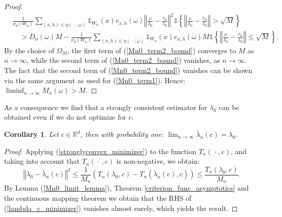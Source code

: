 \documentclass{article}
\newcommand{\RR}{\mathbb{R}}
\newcommand{\blank}{{\mspace{2mu}\cdot\mspace{2mu}}}
\theoremstyle{plain}
\newtheorem{corollary}{Corollary}
\theoremstyle{remark}
\theoremstyle{definition}
\begin{document}
\begin{proof}
    \begin{align}
        &\frac{1}{\nu_d(W_n)}\sum_{(x,h) \in \eta(\blank;\omega)} \mathds{1}_{W_n}(x)v_{x,h}(\omega)\left\Vert \frac{x}{\lambda_0} - \frac{c_0}{\lambda_0} \right\Vert^2 \mathds{1}\left\{\left\Vert \frac{x}{\lambda_0} - \frac{c_0}{\lambda_0} \right\Vert > \sqrt{M} \right\} \nonumber \\
        &\quad> D_n(\omega)M - \frac{1}{\nu_d(W_n)}\sum_{(x,h) \in \eta(\blank;\omega)} \mathds{1}_{W_n}(x)v_{x,h}(\omega)M\mathds{1}\left\{\left\Vert \frac{x}{\lambda_0} - \frac{c_0}{\lambda_0} \right\Vert \leq \sqrt{M} \right\} .\label{Mn0_term2_bound}
    \end{align}
    By the choice of $\Omega_M$, the first term of (\ref{Mn0_term2_bound}) converges to $M$ as $n \to \infty$, while the second term of (\ref{Mn0_term2_bound}) vanishes, as $n \to \infty$. The fact that the second term of (\ref{Mn0_term2_bound}) vanishes can be shown via the same argument as used for (\ref{Mn0_term1}). Hence: $\liminf_{n \to \infty} M_n(\omega) > M$. 
\end{proof}

As a consequence we find that a strongly consistent estimator for $\lambda_0$ can be obtained even if we do not optimize for $c$. 

\begin{corollary}\label{corr_consistentcy_lambda_c}
    Let $c \in \RR^d$, then with probability one: $\lim_{n \to \infty} \bar{\lambda}_n(c) = \lambda_0$.
\end{corollary}

\begin{proof}
Applying (\ref{stronglyconvex_minimizer}) to the function $T_n(\blank,c)$, and taking into account that $T_n(\blank,c)$ is non-negative, we obtain:
\begin{equation}
    \left\Vert \lambda_0 - \bar{\lambda}_n(c) \right\Vert^2 \leq \frac{1}{M_n}\left(T_n(\lambda_0,c) - T_n(\bar{\lambda}_n(c),c)\right) \leq \frac{T_n(\lambda_0,c)}{M_n}.\label{lambda_c_minimizer}
\end{equation}
By Lemma (\ref{Mn0_limit_lemma}), Theorem \ref{criterion_func_asymptotics} and the continuous mapping theorem we obtain that the RHS of (\ref{lambda_c_minimizer}) vanishes almost surely, which yields the result.
\end{proof}
\end{document}
